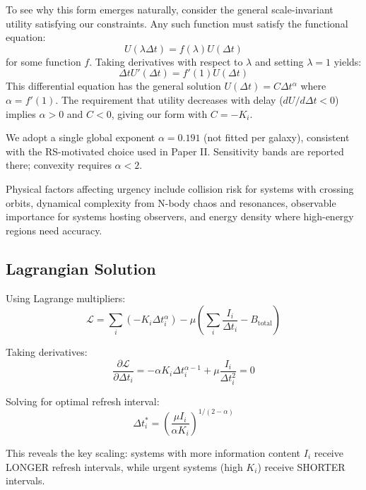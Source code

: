 \documentclass[usenatbib]{mnras}
\begin{document}
To see why this form emerges naturally, consider the general scale-invariant utility satisfying our constraints. Any such function must satisfy the functional equation:
\begin{equation}
U(\lambda \Delta t) = f(\lambda) U(\Delta t)
\end{equation}
for some function $f$. Taking derivatives with respect to $\lambda$ and setting $\lambda = 1$ yields:
\begin{equation}
\Delta t U'(\Delta t) = f'(1) U(\Delta t)
\end{equation}
This differential equation has the general solution $U(\Delta t) = C \Delta t^{\alpha}$ where $\alpha = f'(1)$. The requirement that utility decreases with delay ($dU/d\Delta t < 0$) implies $\alpha > 0$ and $C < 0$, giving our form with $C = -K_i$.

We adopt a single global exponent $\alpha=0.191$ (not fitted per galaxy), consistent with the RS-motivated choice used in Paper II. Sensitivity bands are reported there; convexity requires $\alpha<2$.

Physical factors affecting urgency include collision risk for systems with crossing orbits, dynamical complexity from N-body chaos and resonances, observable importance for systems hosting observers, and energy density where high-energy regions need accuracy.

\subsection{Lagrangian Solution}

Using Lagrange multipliers:
\begin{equation}
\mathcal{L} = \sum_i (-K_i \Delta t_i^\alpha) - \mu\left(\sum_i \frac{I_i}{\Delta t_i} - B_{\text{total}}\right)
\end{equation}

Taking derivatives:
\begin{equation}
\frac{\partial \mathcal{L}}{\partial \Delta t_i} = -\alpha K_i \Delta t_i^{\alpha-1} + \mu \frac{I_i}{\Delta t_i^2} = 0
\end{equation}

Solving for optimal refresh interval:
\begin{equation}
\Delta t_i^* = \left(\frac{\mu I_i}{\alpha K_i}\right)^{1/(2-\alpha)}
\end{equation}

This reveals the key scaling: systems with more information content $I_i$ receive LONGER refresh intervals, while urgent systems (high $K_i$) receive SHORTER intervals.
\end{document}
